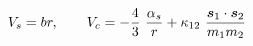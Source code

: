 \begin{equation}
V_s =br,~~~~~~V_c= -\frac{4}{3}~\frac{\alpha_s}{r} + \kappa_{12}~\frac{\mbox{\boldmath$s$}_1 \cdot
\mbox{\boldmath$s$}_2}{m_1 m_2 }
\end{equation}

